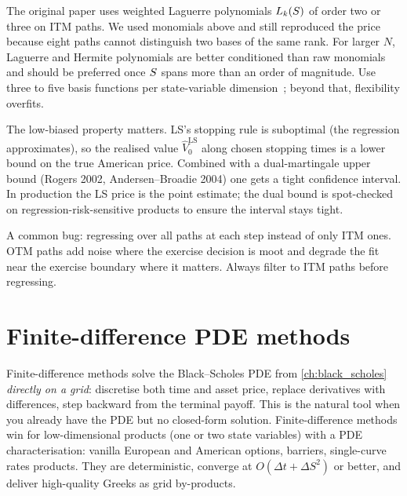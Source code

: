 The original paper uses weighted Laguerre polynomials $L_k(S)$
of order two or three on ITM paths.  We used monomials above and
still reproduced the price because eight paths cannot distinguish
two bases of the same rank.  For larger $N$, Laguerre and Hermite
polynomials are better conditioned than raw monomials and should be
preferred once $S$ spans more than an order of magnitude.  Use
three to five basis functions per state-variable
dimension~\citeGlasserman; beyond that, flexibility overfits.

The low-biased property matters.  LS's stopping rule is suboptimal
(the regression approximates), so the realised value $\hat
V_0^{\mathrm{LS}}$ along chosen stopping times is a lower bound on
the true American price.  Combined with a dual-martingale upper bound
(Rogers 2002, Andersen--Broadie 2004) one gets a tight confidence
interval.  In production the LS price is the point estimate; the
dual bound is spot-checked on regression-risk-sensitive products to
ensure the interval stays tight.

\begin{pitfallbox}[title={LS regressing all paths rather than ITM only}]
A common bug: regressing over all paths at each step instead of only
ITM ones.  OTM paths add noise where the exercise decision is moot
and degrade the fit near the exercise boundary where it matters.
Always filter to ITM paths before regressing.
\end{pitfallbox}


\section{Finite-difference PDE methods}
\label{sec:finite_difference}

Finite-difference methods solve the Black--Scholes PDE from
\cref{ch:black_scholes} \emph{directly on a grid}: discretise both
time and asset price, replace derivatives with differences, step
backward from the terminal payoff.  This is the natural tool when you
already have the PDE but no closed-form solution.  Finite-difference
methods win for low-dimensional products (one or two state variables)
with a PDE characterisation: vanilla European and American options,
barriers, single-curve rates products.  They are deterministic,
converge at $O(\Delta t + \Delta S^2)$ or better, and deliver
high-quality Greeks as grid by-products.

